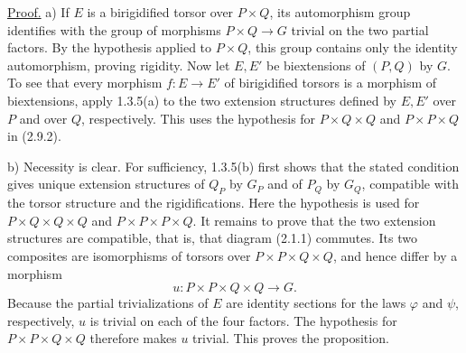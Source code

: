 \underline{Proof.} a) If $E$ is a birigidified torsor over
$P\times Q$, its automorphism group identifies with the group of
morphisms $P\times Q\longrightarrow G$ trivial on the two partial
factors. By the hypothesis applied to $P\times Q$, this group contains
only the identity automorphism, proving rigidity. Now let $E,E'$ be
biextensions of $(P,Q)$ by $G$. To see that every morphism
$f:E\longrightarrow E'$ of birigidified torsors is a morphism of
biextensions, apply 1.3.5(a) to the two extension structures defined
by $E,E'$ over $P$ and over $Q$, respectively. This uses the
hypothesis for $P\times Q\times Q$ and $P\times P\times Q$ in
(2.9.2).

\noindent
b) Necessity is clear. For sufficiency, 1.3.5(b) first shows that the
stated condition gives unique extension structures of $Q_P$ by $G_P$
and of $P_Q$ by $G_Q$, compatible with the torsor structure and the
rigidifications. Here the hypothesis is used for
$P\times Q\times Q\times Q$ and $P\times P\times P\times Q$.
It remains to prove that the two extension structures are compatible,
that is, that diagram (2.1.1) commutes. Its two composites are
isomorphisms of torsors over $P\times P\times Q\times Q$, and hence
differ by a morphism
\[
 u:P\times P\times Q\times Q\longrightarrow G.
\]
Because the partial trivializations of $E$ are identity sections for
the laws $\varphi$ and $\psi$, respectively, $u$ is trivial on each of
the four factors. The hypothesis for
$P\times P\times Q\times Q$ therefore makes $u$ trivial. This proves
the proposition.

